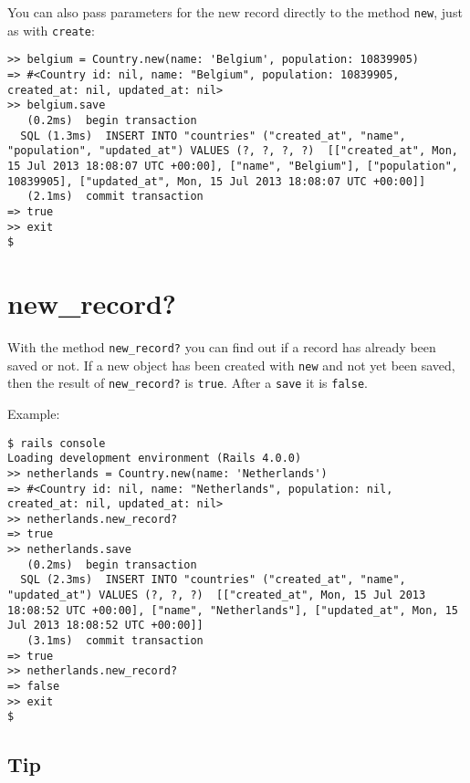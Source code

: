 \documentclass[a4paper]{book}
\begin{document}
You can also pass parameters for the new record directly to the method \texttt{new}, just as with \texttt{create}:

\begin{shaded}\begin{verbatim}
>> belgium = Country.new(name: 'Belgium', population: 10839905)
=> #<Country id: nil, name: "Belgium", population: 10839905, created_at: nil, updated_at: nil>
>> belgium.save
   (0.2ms)  begin transaction
  SQL (1.3ms)  INSERT INTO "countries" ("created_at", "name", "population", "updated_at") VALUES (?, ?, ?, ?)  [["created_at", Mon, 15 Jul 2013 18:08:07 UTC +00:00], ["name", "Belgium"], ["population", 10839905], ["updated_at", Mon, 15 Jul 2013 18:08:07 UTC +00:00]]
   (2.1ms)  commit transaction
=> true
>> exit
$
\end{verbatim}\end{shaded}

\section{new\_record?}\label{newux5frecord}

With the method \texttt{new\_record?} you can find out if a record has already been saved or not. If a new object has been created with \texttt{new} and not yet been saved, then the result of \texttt{new\_record?} is \texttt{true}. After a \texttt{save} it is \texttt{false}.

Example:

\begin{shaded}\begin{verbatim}
$ rails console
Loading development environment (Rails 4.0.0)
>> netherlands = Country.new(name: 'Netherlands')
=> #<Country id: nil, name: "Netherlands", population: nil, created_at: nil, updated_at: nil>
>> netherlands.new_record?
=> true
>> netherlands.save
   (0.2ms)  begin transaction
  SQL (2.3ms)  INSERT INTO "countries" ("created_at", "name", "updated_at") VALUES (?, ?, ?)  [["created_at", Mon, 15 Jul 2013 18:08:52 UTC +00:00], ["name", "Netherlands"], ["updated_at", Mon, 15 Jul 2013 18:08:52 UTC +00:00]]
   (3.1ms)  commit transaction
=> true
>> netherlands.new_record?
=> false
>> exit
$
\end{verbatim}\end{shaded}

\subsection{Tip}\label{tip-7}
\end{document}
